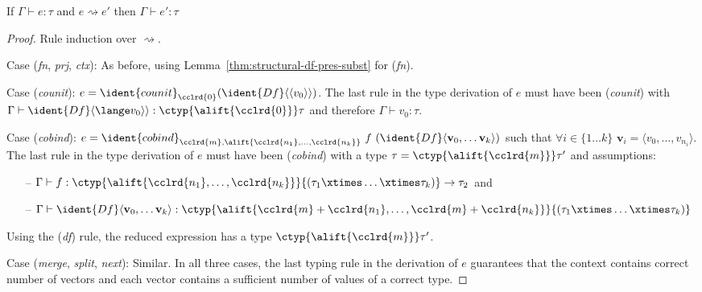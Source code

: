 \begin{theorem}
\label{thm:structural-df-pres}
  If $\Gamma \vdash e : \tau$ and $e \rightsquigarrow e'$ then $\Gamma \vdash e' : \tau$
\end{theorem}
\begin{proof}
  Rule induction over $\rightsquigarrow$.

\vspace{0.25em}\noindent\hangindent=0.6cm
Case (\emph{fn}, \emph{prj}, \emph{ctx}): As before, using Lemma~\ref{thm:structural-df-pres-subst} for (\emph{fn}).

\vspace{0.25em}\noindent\hangindent=0.6cm
Case (\emph{counit}): $e = \ident{counit}_{\cclrd{0}}(\ident{Df} \langle\langle v_0 \rangle\rangle)$. The last rule in the type
  derivation of $e$ must have been (\emph{counit}) with $\Gamma \vdash \ident{Df} \langle\lange v_0 \rangle\rangle : \ctyp{\alift{\cclrd{0}}}\tau$
  and therefore $\Gamma \vdash v_0 : \tau$.

\vspace{0.25em}\noindent\hangindent=0.6cm
Case (\emph{cobind}): $e = \ident{cobind}_{\cclrd{m}, \alift{\cclrd{n_1},\ldots,\cclrd{n_k}}}~f~(\ident{Df}\langle \textbf{v}_0, \ldots \textbf{v}_{k} \rangle)$
  such that $\forall i\in\{1\ldots k\}$ $\textbf{v}_i = \langle v_0, \ldots, v_{n_i}\rangle$. The last rule in the type derivation of $e$ must have been
  (\emph{cobind}) with a type $\tau = \ctyp{\alift{\cclrd{m}}}\tau'$ and assumptions:
\begin{itemize}[noitemsep,leftmargin=1.5cm,topsep=0pt]
  \item[--] $\Gamma \vdash f : \ctyp{\alift{\cclrd{n_1},\ldots,\cclrd{n_k}}}{(\tau_1\xtimes\ldots\xtimes\tau_k)} \rightarrow \tau_2$ and
  \item[--] $\Gamma \vdash \ident{Df}\langle \textbf{v}_0, \ldots \textbf{v}_{k} \rangle : \ctyp{\alift{\cclrd{m}+\cclrd{n_1},\ldots,\cclrd{m}+\cclrd{n_k}}}{(\tau_1\xtimes\ldots\xtimes\tau_k)}$
\end{itemize}
%
\hspace{0.5cm} Using the (\emph{df}) rule, the reduced expression has a type $\ctyp{\alift{\cclrd{m}}}\tau'$.

\vspace{0.25em}\noindent\hangindent=0.6cm
Case (\emph{merge}, \emph{split}, \emph{next}): Similar. In all three cases, the last typing rule in the derivation of $e$
  guarantees that the context contains correct number of vectors and each vector contains a
  sufficient number of values of a correct type.
\end{proof}

